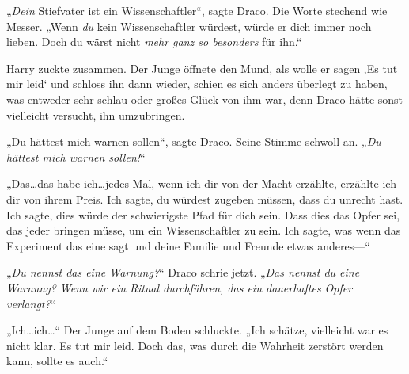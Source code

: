 „\emph{Dein} Stiefvater ist ein Wissenschaftler“, sagte Draco. Die Worte stechend wie Messer. „Wenn \emph{du} kein Wissenschaftler würdest, würde er dich immer noch lieben. Doch du wärst nicht \emph{mehr ganz so besonders} für ihn.“

Harry zuckte zusammen. Der Junge öffnete den Mund, als wolle er sagen ‚Es tut mir leid‘ und schloss ihn dann wieder, schien es sich anders überlegt zu haben, was entweder sehr schlau oder großes Glück von ihm war, denn Draco hätte sonst vielleicht versucht, ihn umzubringen.

„Du hättest mich warnen sollen“, sagte Draco. Seine Stimme schwoll an. „\emph{Du hättest mich warnen sollen!}“

„Das…das habe ich…jedes Mal, wenn ich dir von der Macht erzählte, erzählte ich dir von ihrem Preis. Ich sagte, du würdest zugeben müssen, dass du unrecht hast. Ich sagte, dies würde der schwierigste Pfad für dich sein. Dass dies das Opfer sei, das jeder bringen müsse, um ein Wissenschaftler zu sein. Ich sagte, was wenn das Experiment das eine sagt und deine Familie und Freunde etwas anderes—“

„\emph{Du nennst das eine Warnung?}“ Draco schrie jetzt. „\emph{Das nennst du eine Warnung? Wenn wir ein Ritual durchführen, das ein dauerhaftes Opfer verlangt?}“

„Ich…ich…“ Der Junge auf dem Boden schluckte. „Ich schätze, vielleicht war es nicht klar. Es tut mir leid. Doch das, was durch die Wahrheit zerstört werden kann, sollte es auch.“

